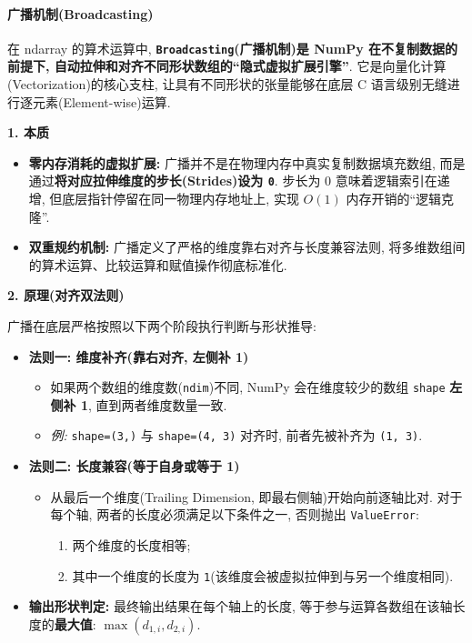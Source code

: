 \documentclass[11pt]{article}
\providecommand{\tightlist}{%
      \setlength{\itemsep}{0pt}\setlength{\parskip}{0pt}}
\begin{document}
    \paragraph{广播机制(Broadcasting)}\label{ux5e7fux64adux673aux5236broadcasting}

    在 ndarray 的算术运算中, \textbf{\texttt{Broadcasting}(广播机制)是 NumPy
在不复制数据的前提下, 自动拉伸和对齐不同形状数组的``隐式虚拟扩展引擎''}.
它是向量化计算(Vectorization)的核心支柱, 让具有不同形状的张量能够在底层
C 语言级别无缝进行逐元素(Element-wise)运算.

\textbf{1. 本质}

\begin{itemize}
\tightlist
\item
  \textbf{零内存消耗的虚拟扩展:}
  广播并不是在物理内存中真实复制数据填充数组,
  而是通过\textbf{将对应拉伸维度的步长(Strides)设为 \texttt{0}}. 步长为
  0 意味着逻辑索引在递增, 但底层指针停留在同一物理内存地址上, 实现
  \(O(1)\) 内存开销的``逻辑克隆''.
\item
  \textbf{双重规约机制:} 广播定义了严格的维度靠右对齐与长度兼容法则,
  将多维数组间的算术运算、比较运算和赋值操作彻底标准化.
\end{itemize}

\textbf{2. 原理(对齐双法则)}

广播在底层严格按照以下两个阶段执行判断与形状推导:

\begin{itemize}
\tightlist
\item
  \textbf{法则一: 维度补齐(靠右对齐, 左侧补 1)}

  \begin{itemize}
  \tightlist
  \item
    如果两个数组的维度数(\texttt{ndim})不同, NumPy 会在维度较少的数组
    \texttt{shape} \textbf{左侧补 1}, 直到两者维度数量一致.
  \item
    \emph{例:} \texttt{shape=(3,)} 与 \texttt{shape=(4,\ 3)} 对齐时,
    前者先被补齐为 \texttt{(1,\ 3)}.
  \end{itemize}
\item
  \textbf{法则二: 长度兼容(等于自身或等于 1)}

  \begin{itemize}
  \tightlist
  \item
    从最后一个维度(Trailing Dimension, 即最右侧轴)开始向前逐轴比对.
    对于每个轴, 两者的长度必须满足以下条件之一, 否则抛出
    \texttt{ValueError}:

    \begin{enumerate}
    \def\labelenumi{\arabic{enumi}.}
    \tightlist
    \item
      两个维度的长度相等;
    \item
      其中一个维度的长度为
      \texttt{1}(该维度会被虚拟拉伸到与另一个维度相同).
    \end{enumerate}
  \end{itemize}
\item
  \textbf{输出形状判定:} 最终输出结果在每个轴上的长度,
  等于参与运算各数组在该轴长度的\textbf{最大值}:
  \(\max(d_{1,i}, d_{2,i})\).
\end{itemize}
\end{document}
